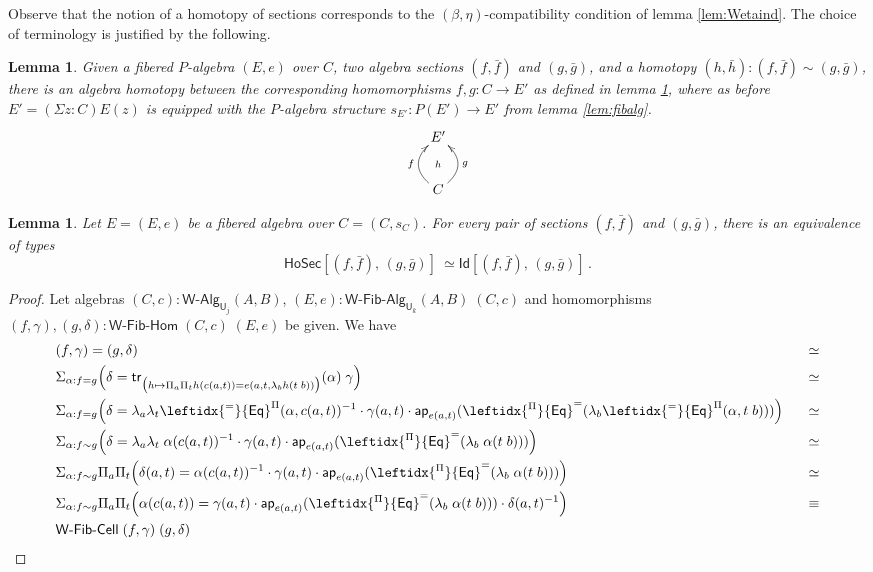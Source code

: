 \documentclass[reqno,10pt,a4paper,oneside]{amsart}
\numberwithin{equation}{section}
\theoremstyle{mythm}
\newtheorem{lemma}[theorem]{Lemma}
\theoremstyle{mydef}
\theoremstyle{myrmk}
\newcommand{\trans}{\mathsf{tr}}
\newcommand{\ct}{\cdot}
\newcommand{\funext}{\leftidx{^\Pi}{\mathsf{Eq}}^{=}}
\newcommand{\happly}{\leftidx{^=}{\mathsf{Eq}}^{\Pi}}
\newcommand{\prd}[1]{\Pi_{#1}}
\newcommand{\sm}[1]{\Sigma_{#1}}
\newcommand{\lam}[1]{\lambda_{#1}}
\newcommand{\app}{\mathsf{ap}}
\newcommand{\Id}{\mathsf{Id}}
\newcommand{\UU}{\mathsf{U}}
\newcommand{\Ho}{\mathsf{Ho}}
\newcommand{\WFibCell}{\mathsf{W}\text{-}\mathsf{Fib}\text{-}\mathsf{Cell}}
\newcommand{\WAlg}{\mathsf{W}\text{-}\mathsf{Alg}}
\newcommand{\WFibAlg}{\mathsf{W}\text{-}\mathsf{Fib}\text{-}\mathsf{Alg}}
\newcommand{\WFibHom}{\mathsf{W}\text{-}\mathsf{Fib}\text{-}\mathsf{Hom}}
\begin{document}
Observe that the notion of a homotopy of sections corresponds to the $(\beta, \eta)$-compatibility condition of lemma \ref{lem:Wetaind}.  The choice of terminology is justified by the following.

\begin{lemma}\label{lem:fibalghom}
Given a fibered $P$-algebra $(E, e)$ over $C$, two algebra sections $(f, \bar{f})$ and $(g, \bar{g})$, and a homotopy $(h, \bar{h}) : (f, \bar{f}) \sim (g, \bar{g})$, there is an algebra  homotopy between the corresponding homomorphisms $f, g : C\to E'$ as defined in lemma \ref{lem:fibalghom}, where as before $E' = (\Sigma z : C) E(z)$ is equipped with the $P$-algebra structure $s_{E'} :P(E')\to E'$ from lemma \ref{lem:fibalg}.
\[
\xymatrix{
 E' \ar@{}[d]|{h} \\ 
C \ar@/^1.2pc/[u]^{f}  \ar@/_1.2pc/[u]_{g}
}
 \]
\end{lemma}




\begin{lemma}\label{lem:fibhomeqid} Let $E = (E, e)$ be a fibered algebra over $C = (C, s_C)$. 
For every pair of sections $(f, \bar{f})$ and $(g, \bar{g})$, 
there is an equivalence of types
\[
\Ho\mathsf{Sec}[ (f, \bar{f}) ,\, (g, \bar{g}) ]\
\simeq 
\Id[ (f, \bar{f}) ,\, (g, \bar{g}) ] \, .
\]
\end{lemma}

\begin{proof}
Let algebras $(C,c) : \WAlg_{\UU_j}(A,B)$, $(E,e) : \WFibAlg_{\UU_k}(A,B) \; (C,c)$ and homomorphisms $(f,\gamma), (g,\delta) : \WFibHom \; (C,c) \; (E,e)$ be given. We have
\begin{alignat*}{4}
& (f,\gamma) = (g,\delta) & \simeq \\
& \sm{\alpha : f = g} \Big(\delta = \trans_{\big(h \mapsto \prd{a}\prd{t} h(c(a,t)) = e(a,t,\lam{b} h(t\;b))\big)}(\alpha) \; \gamma\Big) & \simeq \\
& \sm{\alpha : f = g} \Big(\delta = \lam{a} \lam{t} \happly(\alpha,c(a,t))^{-1} \ct \gamma(a,t) \ct \app_{e(a,t)}(\funext (\lam{b}\happly(\alpha,t \; b))) \Big) & \;\;\; \simeq \\
& \sm{\alpha : f \sim g} \Big(\delta = \lam{a} \lam{t} \; \alpha(c(a,t))^{-1} \ct \gamma(a,t) \ct \app_{e(a,t)}(\funext (\lam{b}\; \alpha(t \; b))) \Big) & \simeq \\
& \sm{\alpha : f \sim g} \prd{a}\prd{t}\Big(\delta(a,t) = \alpha(c(a,t))^{-1} \ct \gamma(a,t) \ct \app_{e(a,t)}(\funext (\lam{b}\; \alpha(t \; b))) \Big) & \simeq \\ 
& \sm{\alpha : f \sim g} \prd{a}\prd{t}\Big(\alpha(c(a,t)) = \gamma(a,t) \ct \app_{e(a,t)}(\funext (\lam{b}\; \alpha(t \; b))) \ct \delta(a,t)^{-1} \Big) & \equiv \\ 
& \WFibCell \; (f,\gamma) \; (g,\delta)
\end{alignat*}
\end{proof}
\end{document}
